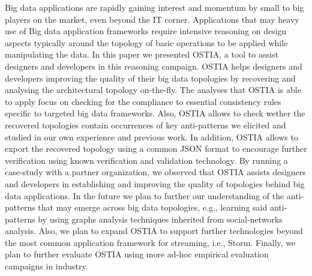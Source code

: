 Big data applications are rapidly gaining interest and momentum by small to big players on the market, even beyond the IT corner. Applications that may heavy use of Big data application frameworks require intensive reasoning on design aspects typically around the topology of basic operations to be applied while manipulating the data. 
In this paper we presented OSTIA, a tool to assist designers and developers in this reasoning campaign. OSTIA helps designers and developers improving the quality of their big data topologies by recovering and analysing the architectural topology on-the-fly. The analyses that OSTIA is able to apply focus on checking for the compliance to essential consistency rules specific to targeted big data frameworks. Also, OSTIA allows to check wether the recovered topologies contain occurrences of key anti-patterns we elicited and studied in our own experience and previous work. In addition, OSTIA allows to export the recovered topology using a common JSON format to encourage further verification using known verification and validation technology. 
By running a case-study with a partner organization, we observed that OSTIA assists designers and developers in establishing and improving the quality of topologies behind big data applications. 
In the future we plan to further our understanding of the anti-patterns that may emerge across big data topologies, e.g., learning said anti-patterns by using graphs analysis techniques inherited from social-networks analysis. Also, we plan to expand OSTIA to support further technologies beyond the most common application framework for streaming, i.e., Storm. Finally, we plan to further evaluate OSTIA using more ad-hoc empirical evaluation campaigns in industry.